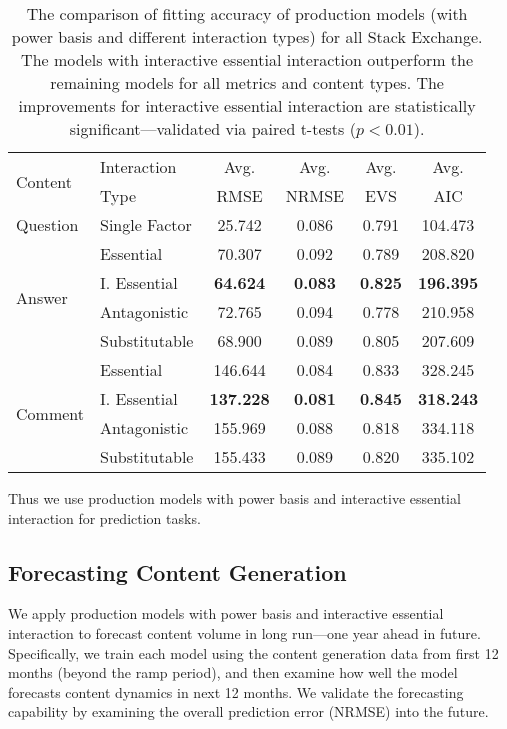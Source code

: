 \begin{table}[ht]
	\vspace{-0.5\baselineskip}
	\caption{The comparison of fitting accuracy of production models (with power basis and different interaction types) for all Stack Exchange. The models with interactive essential interaction outperform the remaining models for all metrics and content types. The improvements for interactive essential interaction are statistically significant---validated via paired t-tests ($p<0.01$).}
    \vspace{-\baselineskip}
	\label{tbl:model_fit}
	\begin{center}
	\begin{tabular}{llcccc}
    \toprule
    \multirow{2}{*}{Content} & Interaction & Avg. & Avg. & Avg. & Avg.\\
    & Type & RMSE & NRMSE & EVS & AIC\\
    \midrule
    Question & Single Factor & 25.742 & 0.086 & 0.791 & 104.473\\
    \midrule
    \multirow{4}{*}{Answer} & Essential & 70.307 & 0.092 & 0.789 & 208.820\\
    & I. Essential & \textbf{64.624} & \textbf{0.083} & \textbf{0.825} & \textbf{196.395}\\
    & Antagonistic & 72.765 & 0.094 &  0.778 & 210.958\\
    & Substitutable & 68.900 & 0.089 & 0.805 & 207.609\\
    \midrule
    \multirow{4}{*}{Comment} & Essential & 146.644 & 0.084 & 0.833 & 328.245\\
    & I. Essential & \textbf{137.228} & \textbf{0.081} & \textbf{0.845} & \textbf{318.243}\\
    & Antagonistic & 155.969 & 0.088 &  0.818 & 334.118\\
    & Substitutable & 155.433 & 0.089 & 0.820 & 335.102\\
    \bottomrule
	\end{tabular}
	\end{center}
    \vspace{-\baselineskip}
\end{table}

Thus we use production models with power basis and interactive essential interaction for prediction tasks.

\subsection{Forecasting Content Generation} 
We apply production models with power basis and interactive essential interaction to forecast content volume in long run---one year ahead in future. Specifically, we train each model using the content generation data from first 12 months (beyond the ramp period), and then examine how well the model forecasts content dynamics in next 12 months. We validate the forecasting capability by examining the overall prediction error (NRMSE) into the future. 

